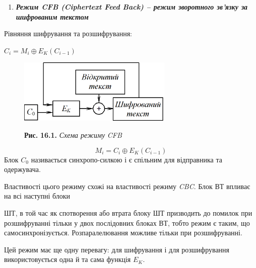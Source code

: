 \documentclass[a4paper]{article}
\newcommand\liststyleWWviiiNumxxi{%
\renewcommand\theenumi{\arabic{enumi}}
\renewcommand\theenumii{\arabic{enumii}}
\renewcommand\theenumiii{\arabic{enumiii}}
\renewcommand\theenumiv{\arabic{enumiv}}
\renewcommand\labelenumi{\theenumi.}
\renewcommand\labelenumii{\theenumii.}
\renewcommand\labelenumiii{\theenumiii.}
\renewcommand\labelenumiv{\theenumiv.}
}
\newcounter{}
\begin{document}
\bigskip


\bigskip

\liststyleWWviiiNumxxi
\begin{enumerate}
\item {\centering\bfseries\itshape
Режим CFB (Ciphertext Feed Back) – режим зворотного зв’язку за шифрованим
текстом
\par}
\end{enumerate}

\bigskip


\bigskip

Рівняння шифрування та розшифрування:

{\centering  ${C_{{i}}=M_{{i}}{\oplus}E_{{K}}(C_{{i-1}})}$\par}

\begin{figure}
\centering
\begin{minipage}{2.9866in}
 \includegraphics[width=2.8957in,height=1.2083in]{crypt-img/crypt-img337.png} 

{\centering
\textbf{Рис. }\textbf{16.}\textbf{1.} \textit{Схема режим}\textit{у}\textit{
}\textit{CFB}
\par}
\end{minipage}
\end{figure}
\begin{equation*}
{M_{{i}}=C_{{i}}{\oplus}E_{{K}}(C_{{i-1}})}
\end{equation*}
Блок  ${C_{{0}}}$ називається синхропо{}-силкою і є спільним для відправника та
одержувача.

Властивості цього режиму схожі на властивості режиму \textit{CBC}. Блок ВТ
впливає на всі наступні блоки 

ШТ, в той час як спотворення або втрата блоку ШТ призводить до помилок при
розшифруванні тільки у двох послідовних блоках ВТ, тобто режим є таким, що
самосинхронізується. Розпаралелювання можливе тільки при розшифруванні.

Цей режим має ще одну перевагу: для шифрування і для розшифрування
використовується одна й та сама функція  ${E_{{K}}}$.


\bigskip


\bigskip
\end{document}
